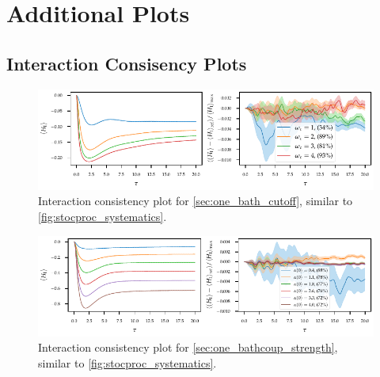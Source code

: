 \chapter{Additional Plots\label{chap:plus_plots}}

\section{Interaction Consisency Plots}
\label{sec:intercons}
\begin{figure}[h]
  \centering
  \includegraphics{figs/one_bath_syst/omega_interaction_consistency}
  \caption{\label{fig:omega_interaction_consistency}Interaction
    consistency plot for \cref{sec:one_bath_cutoff}, similar to
    \cref{fig:stocproc_systematics}.}
\end{figure}
\begin{figure}[h]
  \centering
  \includegraphics{figs/one_bath_syst/delta_interaction_consistency}
  \caption{\label{fig:delta_interaction_consistency}Interaction
    consistency plot for \cref{sec:one_bathcoup_strength}, similar to
    \cref{fig:stocproc_systematics}.}
\end{figure}
